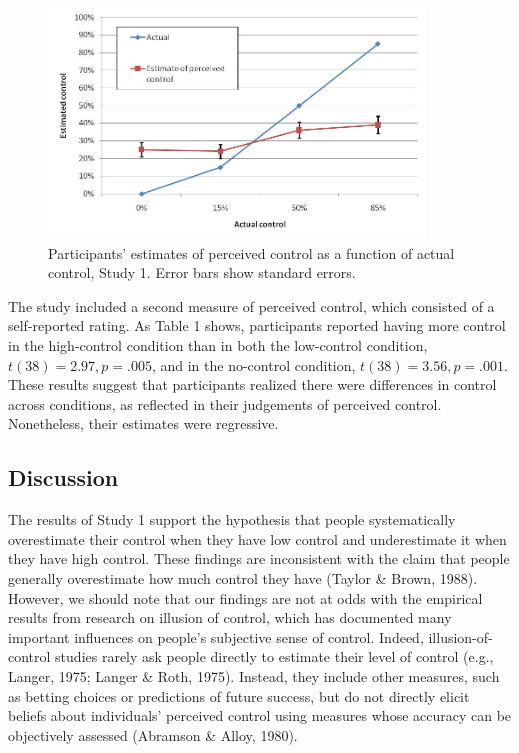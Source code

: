 \documentclass[USenglish,letterpaper,12pt,extrafontsizes,oneside,onecolumn,final]{memoir}
\begin{document}
\begin{figure}[t]
\begin{center}
\includegraphics[width=10cm]{ioc-fig-2}
\caption{\textsf{Participants' estimates of perceived control as a function of actual control, Study 1. Error bars show standard errors.}\label{fig:ioc-fig-2}}
\end{center}
\end{figure}

The study included a second measure of perceived control, which consisted of a self-reported rating. As Table 1 shows, participants reported having more control in the high-control condition than in both the low-control condition, $t(38) = 2.97, p = .005$, and in the no-control condition, $t(38) = 3.56, p = .001$. These results suggest that participants realized there were differences in control across conditions, as reflected in their judgements of perceived control. Nonetheless, their estimates were regressive.

\subsection{Discussion}
The results of Study 1 support the hypothesis that people systematically overestimate their control when they have low control and underestimate it when they have high control. These findings are inconsistent with the claim that people generally overestimate how much control they have (Taylor \& Brown, 1988). However, we should note that our findings are not at odds with the empirical results from research on illusion of control, which has documented many important influences on people's subjective sense of control. Indeed, illusion-of-control studies rarely ask people directly to estimate their level of control (e.g., Langer, 1975; Langer \& Roth, 1975). Instead, they include other measures, such as betting choices or predictions of future success, but do not directly elicit beliefs about individuals' perceived control using measures whose accuracy can be objectively assessed (Abramson \& Alloy, 1980). 
\end{document}
